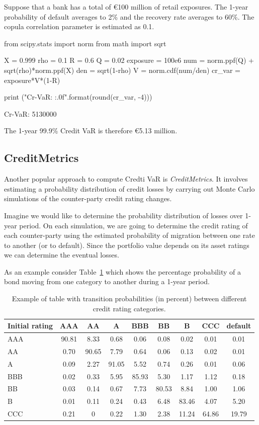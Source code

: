 Suppose that a bank has a total of \euro{100} million of retail exposures. The 1-year probability of default averages to 2\% and the recovery rate averages to 60\%. The copula correlation parameter is estimated as 0.1.

\begin{ipython}
from scipy.stats import norm
from math import sqrt

X = 0.999
rho = 0.1
R = 0.6
Q = 0.02
exposure = 100e6
num = norm.ppf(Q) + sqrt(rho)*norm.ppf(X)
den = sqrt(1-rho)
V = norm.cdf(num/den)
cr_var = exposure*V*(1-R)

print ("Cr-VaR: {:.0f}".format(round(cr_var, -4)))
\end{ipython}
\begin{ioutput}
Cr-VaR: 5130000
\end{ioutput}
\noindent
The 1-year 99.9\% Credit VaR is therefore \euro{5.13} million.

\subsection{CreditMetrics}
Another popular approach to compute Credti VaR is \emph{CreditMetrics}. It involves estimating a probability distribution of credit losses by carrying out Monte Carlo simulations of the counter-party credit rating changes.

Imagine we would like to determine the probability distribution of losses over 1-year period. On each simulation, we are going to determine the credit rating of each counter-party using the estimated probability of migration between one rate to another (or to default). Since the portfolio value depends on its asset ratings we can determine the eventual losses. 

As an example consider Table~\ref{tab:credit_ratings} which shows the percentage probability of a bond moving from one category to another during a 1-year period.

\begin{table}[htb]
	\centering
	\begin{tabular}{|l|c|c|c|c|c|c|c|c|}
	\hline
	Initial rating & AAA & AA & A & BBB & BB & B & CCC & default \\
	\hline
	\hline
	AAA & 90.81 & 8.33 & 0.68 & 0.06 & 0.08 & 0.02 & 0.01& 0.01 \\ 
	\hline
	AA & 0.70 & 90.65 & 7.79 & 0.64 & 0.06 & 0.13 & 0.02 & 0.01 \\ 
	\hline
	A & 0.09 & 2.27 & 91.05 & 5.52 & 0.74 & 0.26 & 0.01 & 0.06 \\ 
	\hline
	BBB & 0.02 & 0.33 & 5.95 & 85.93 & 5.30 & 1.17 & 1.12 & 0.18 \\
	\hline
	BB & 0.03 & 0.14 & 0.67 & 7.73 & 80.53 & 8.84 & 1.00 & 1.06 \\
	\hline
	B & 0.01 & 0.11 & 0.24 & 0.43 & 6.48 & 83.46 & 4.07 & 5.20 \\
	\hline
	CCC & 0.21 & 0 & 0.22 & 1.30 & 2.38 & 11.24 & 64.86 & 19.79 \\		
	\hline
\end{tabular}
\caption{Example of table with transition probabilities (in percent) between different credit rating categories.}
\label{tab:credit_ratings}
\end{table}


